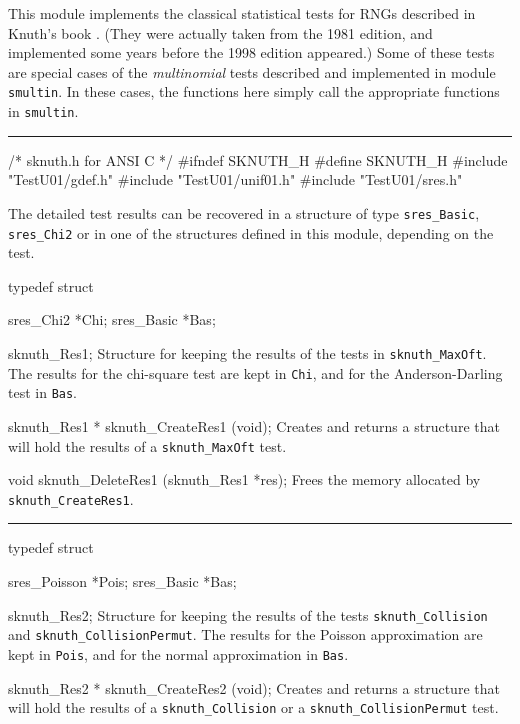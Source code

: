 
This module implements the classical statistical tests for RNGs
described in Knuth's book \cite{rKNU81a}.  
(They were actually taken from the 1981 edition, and implemented
some years before the 1998 edition \cite{rKNU98a} appeared.)
Some of these tests are special cases of the {\em multinomial\/}
tests described and implemented in module {\tt smultin}.
In these cases, the functions here simply call the appropriate 
functions in {\tt smultin}.
\resdef

\bigskip\hrule

\code\hide
/* sknuth.h  for ANSI C */
#ifndef SKNUTH_H
#define SKNUTH_H
\endhide
#include "TestU01/gdef.h"
#include "TestU01/unif01.h"
#include "TestU01/sres.h"
\endcode


\ifdetailed  %


The detailed test results can be recovered in a structure of type
{\tt sres\_Basic}, {\tt sres\_Chi2} or in one of the structures
defined in this module, depending on the test.

\code

typedef struct {

   sres_Chi2 *Chi;
   sres_Basic *Bas;

} sknuth_Res1;
\endcode
 \tab
  Structure for keeping the results of the tests in {\tt sknuth\_MaxOft}.
  The results for the chi-square test are kept in
  {\tt Chi}, and for the Anderson-Darling test in  {\tt Bas}.
 \endtab
\code


sknuth_Res1 * sknuth_CreateRes1 (void);
\endcode
 \tab 
  Creates and returns a structure that will hold the results
  of a  {\tt sknuth\_MaxOft} test. 
 \endtab
\code


void sknuth_DeleteRes1 (sknuth_Res1 *res);
\endcode
 \tab 
  Frees the memory allocated by {\tt sknuth\_CreateRes1}.
 \endtab

\bigskip\hrule\bigskip

\code
typedef struct {

   sres_Poisson *Pois;
   sres_Basic *Bas;

} sknuth_Res2;
\endcode
 \tab
  Structure for keeping the results of the tests {\tt sknuth\_Collision}
  and {\tt sknuth\_CollisionPermut}.
  The results for the Poisson approximation are kept in
  {\tt Pois}, and for the normal approximation in  {\tt Bas}.
 \endtab
\code


sknuth_Res2 * sknuth_CreateRes2 (void);
\endcode
 \tab 
  Creates and returns a structure that will hold the results
  of a  {\tt sknuth\_Collision} or a {\tt sknuth\_CollisionPermut} test. 
 \endtab
\code


